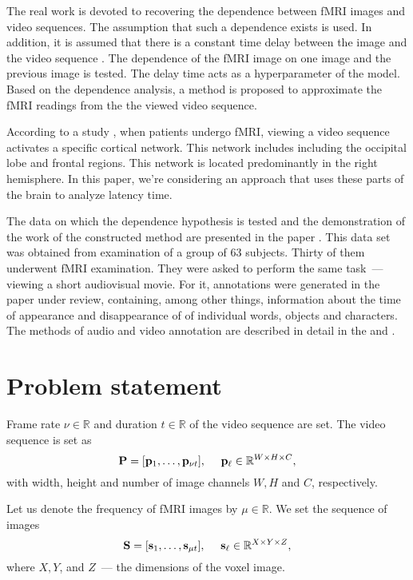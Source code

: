 \documentclass{article}
\begin{document}
The real work is devoted to recovering the dependence between fMRI images and video sequences.
The assumption that such a dependence exists is used.
In addition, it is assumed that there is a constant time delay between the image and the video sequence
\citep{Logothetis2003}.
The dependence of the fMRI image on one image and the previous image is tested.
The delay time acts as a hyperparameter of the model.
Based on the dependence analysis, a method is proposed to approximate the fMRI readings from the
the viewed video sequence.

According to a study \citep{anderson2006}, when patients undergo fMRI,
viewing a video sequence activates a specific cortical network. This network includes
including the occipital lobe and frontal regions. This network is located
predominantly in the right hemisphere. In this paper, we're considering an approach
that uses these parts of the brain to analyze latency time.

The data on which the dependence hypothesis is tested and the demonstration of the work of the constructed method
 are presented in the paper \citep{Berezutskaya2022}.
This data set was obtained from examination of a group of 63 subjects. Thirty of them underwent fMRI examination.
They were asked to perform the same task~--- viewing a short audiovisual movie.
For it, annotations were generated in the paper under review, containing, among other things, information about the time of appearance and disappearance of
of individual words, objects and characters. The methods of audio and video annotation are described in detail in the
\citep{boersma2018praat} and \citep{Berezutskaya2020}.

\section{Problem statement}

Frame rate $\nu \in \mathbb{R}$ and duration $t \in \mathbb{R}$ of the video sequence are set.
The video sequence is set as
\begin{equation}
	\label{eq1}
	\mathbf{P} = [\mathbf{p}_1, \ldots, \mathbf{p}_{\nu t}], \quad\
	\mathbf{p}_{\ell} \in \mathbb{R}^{W \times H \times C},
\end{equation}
with width, height and number of image channels $W, H$ and $C$, respectively.

Let us denote the frequency of fMRI images by $\mu \in \mathbb{R}$. We set the sequence of images
\begin{equation}
	\label{eq2}
	\mathbf{S} = [\mathbf{s}_1, \ldots, \mathbf{s}_{\mu t}], \quad\
	\mathbf{s}_{\ell} \in \mathbb{R}^{X \times Y \times Z},
\end{equation}
where $X, Y$, and $Z$~--- the dimensions of the voxel image.
\end{document}
